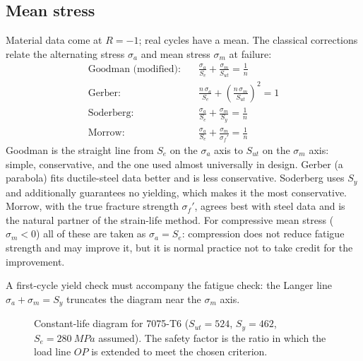 \documentclass[11pt,a4paper]{article}
\begin{document}
\subsection{Mean stress}
Material data come at $R=-1$; real cycles have a mean. The classical corrections relate the alternating stress $\sigma_a$ and mean stress $\sigma_m$ at failure:
\begin{align}
  \text{Goodman (modified):}&\quad \frac{\sigma_a}{S_e}+\frac{\sigma_m}{S_{ut}}=\frac{1}{n}\\
  \text{Gerber:}&\quad \frac{n\,\sigma_a}{S_e}+\left(\frac{n\,\sigma_m}{S_{ut}}\right)^{2}=1\\
  \text{Soderberg:}&\quad \frac{\sigma_a}{S_e}+\frac{\sigma_m}{S_{y}}=\frac{1}{n}\\
  \text{Morrow:}&\quad \frac{\sigma_a}{S_e}+\frac{\sigma_m}{\sigma_f'}=\frac{1}{n}
\end{align}
Goodman is the straight line from $S_e$ on the $\sigma_a$ axis to $S_{ut}$ on the $\sigma_m$ axis: simple, conservative, and the one used almost universally in design. Gerber (a parabola) fits ductile-steel data better and is less conservative. Soderberg uses $S_y$ and additionally guarantees no yielding, which makes it the most conservative. Morrow, with the true fracture strength $\sigma_f'$, agrees best with steel data and is the natural partner of the strain-life method. For compressive mean stress ($\sigma_m<0$) all of these are taken as $\sigma_a=S_e$: compression does not reduce fatigue strength and may improve it, but it is normal practice not to take credit for the improvement.

A first-cycle yield check must accompany the fatigue check: the Langer line $\sigma_a+\sigma_m=S_y$ truncates the diagram near the $\sigma_m$ axis.

\begin{figure}[H]\centering
{}
\caption{Constant-life diagram for 7075-T6 ($S_{ut}=524$, $S_y=462$, $S_e=\SI{280}{MPa}$ assumed). The safety factor is the ratio in which the load line $OP$ is extended to meet the chosen criterion.}
\label{fig:goodman}
\end{figure}
\end{document}
